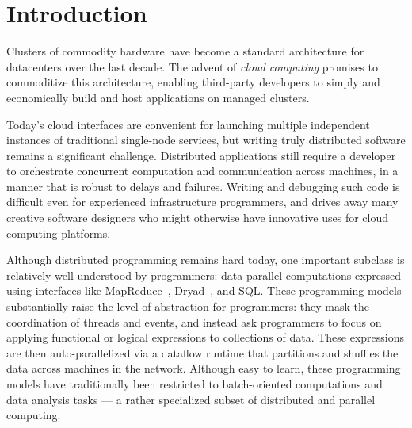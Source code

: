 \section{Introduction}
Clusters of commodity hardware have become a standard architecture for
datacenters over the last decade.
The advent of \emph{cloud computing} promises to commoditize
this architecture, enabling third-party
developers to simply and economically build and host applications on managed clusters.  

Today's cloud interfaces are convenient for launching multiple independent
instances of traditional single-node services, but writing truly distributed
software remains a significant challenge.  Distributed applications still
require a developer to orchestrate concurrent computation and communication
across machines, in a manner that is robust to delays and failures.  Writing and
debugging such code is difficult even for experienced infrastructure
programmers, and drives away many creative software designers who might
otherwise have innovative uses for cloud computing platforms.





Although distributed programming remains hard today, one important subclass is
relatively well-understood by programmers: data-parallel computations expressed
using interfaces like MapReduce~\cite{mapreduce-osdi}, Dryad~\cite{dryad}, and
SQL\@.  These programming models substantially raise the level of abstraction
for programmers: they mask the coordination of threads and events, and instead
ask programmers to focus on applying functional or logical expressions to
collections of data.  These expressions are then auto-parallelized via a
dataflow runtime that partitions and shuffles the data across machines in the
network. Although easy to learn, these programming models have traditionally
been restricted to batch-oriented computations and data analysis tasks --- a
rather specialized subset of distributed and parallel computing.

